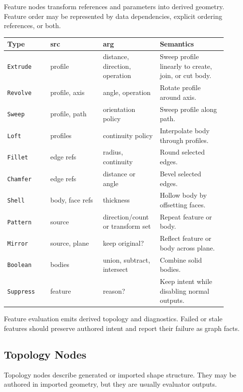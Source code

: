 \documentclass[11pt]{article}
\newcommand{\Type}[1]{\texttt{#1}}
\begin{document}
Feature nodes transform references and parameters into derived geometry. Feature order may be represented by data dependencies, explicit ordering references, or both.

\begin{center}
\small
\begin{tabular}{@{}p{0.18\linewidth}p{0.22\linewidth}p{0.22\linewidth}p{0.28\linewidth}@{}}
\hline
\textbf{Type} & \textbf{src} & \textbf{arg} & \textbf{Semantics} \\
\hline
\Type{Extrude} & profile & distance, direction, operation & Sweep profile linearly to create, join, or cut body. \\
\Type{Revolve} & profile, axis & angle, operation & Rotate profile around axis. \\
\Type{Sweep} & profile, path & orientation policy & Sweep profile along path. \\
\Type{Loft} & profiles & continuity policy & Interpolate body through profiles. \\
\Type{Fillet} & edge refs & radius, continuity & Round selected edges. \\
\Type{Chamfer} & edge refs & distance or angle & Bevel selected edges. \\
\Type{Shell} & body, face refs & thickness & Hollow body by offsetting faces. \\
\Type{Pattern} & source & direction/count or transform set & Repeat feature or body. \\
\Type{Mirror} & source, plane & keep original? & Reflect feature or body across plane. \\
\Type{Boolean} & bodies & union, subtract, intersect & Combine solid bodies. \\
\Type{Suppress} & feature & reason? & Keep intent while disabling normal outputs. \\
\hline
\end{tabular}
\end{center}

Feature evaluation emits derived topology and diagnostics. Failed or stale features should preserve authored intent and report their failure as graph facts.

\subsection{Topology Nodes}

Topology nodes describe generated or imported shape structure. They may be authored in imported geometry, but they are usually evaluator outputs.
\end{document}
